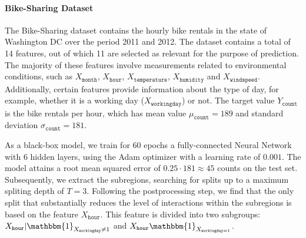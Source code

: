 \documentclass[12pt]{article}
\newcommand{\when}[1]{\mathbbm{1}_{#1}}
\begin{document}
\paragraph{Bike-Sharing Dataset}

The Bike-Sharing dataset contains the hourly bike rentals in the state of Washington DC over the period 2011 and 2012.
The dataset contains a total of 14 features, out of which 11 are selected as relevant for the purpose of prediction.
The majority of these features involve measurements related to environmental conditions,
such as $X_{\mathtt{month}}$, $X_{\mathtt{hour}}$, $X_{\mathtt{temperature}}$, $X_{\mathtt{humidity}}$ and $X_{\mathtt{windspeed}}$.
Additionally, certain features provide information about the type of day, for example, whether it is a working day ($X_{\mathtt{workingday}}$) or not.
The target value \( Y_{\mathtt{count}}\) is the bike rentals per hour, which has mean value
\(\mu_{\mathtt{count}} = 189\) and standard deviation \(\sigma_{\mathtt{count}} = 181\).

As a black-box model, we train for \(60\) epochs a fully-connected Neural Network with 6 hidden layers, using the Adam optimizer with a learning rate of $0.001$.
The model attains a root mean squared error of \( 0.25 \cdot 181 \approx 45\) counts on the test set.
Subsequently, we extract the subregions, searching for splits up to a maximum spliting depth of \(T=3\).
Following the postprocessing step, we find that the only split that substantially reduces the level of interactions within the subregions is based on the feature
$X_{\mathtt{hour}}$. This feature is divided into two subgroups: $X_{\mathtt{hour}} | \when{X_{\mathtt{workingday}} \neq 1}$ and $X_{\mathtt{hour}} \when{X_{\mathtt{workingday} = 1}}$.
\end{document}

